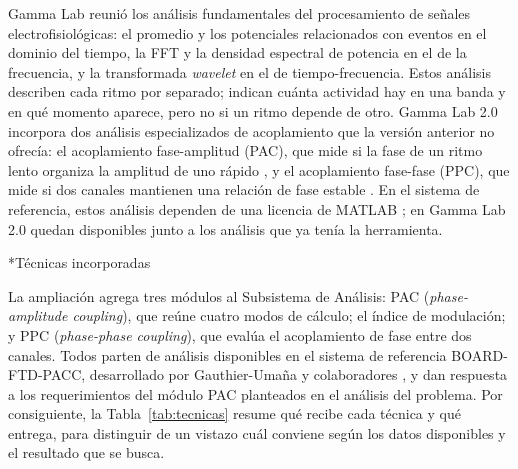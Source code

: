 \documentclass[12pt,letterpaper,oneside]{article}
\makeatletter
\newcommand{\subsubsubsection}[1]{%
  \@startsection{paragraph}{4}{\z@}{10pt plus 2pt minus 1pt}{4pt}%
    {\normalfont\normalsize\bfseries\itshape}*{#1}}
\makeatother
\begin{document}
Gamma Lab \cite{asencio2025} reunió los análisis fundamentales del procesamiento de señales electrofisiológicas: el promedio y los potenciales relacionados con eventos en el dominio del tiempo, la FFT y la densidad espectral de potencia en el de la frecuencia, y la transformada \textit{wavelet} en el de tiempo-frecuencia. Estos análisis describen cada ritmo por separado; indican cuánta actividad hay en una banda y en qué momento aparece, pero no si un ritmo depende de otro. Gamma Lab 2.0 incorpora dos análisis especializados de acoplamiento que la versión anterior no ofrecía: el acoplamiento fase-amplitud (PAC), que mide si la fase de un ritmo lento organiza la amplitud de uno rápido \cite{canolty2006}, y el acoplamiento fase-fase (PPC), que mide si dos canales mantienen una relación de fase estable \cite{vinck2010}. En el sistema de referencia, estos análisis dependen de una licencia de MATLAB \cite{gauthier2023}; en Gamma Lab 2.0 quedan disponibles junto a los análisis que ya tenía la herramienta.

\subsubsubsection{Técnicas incorporadas}

La ampliación agrega tres módulos al Subsistema de Análisis: PAC (\textit{phase-amplitude coupling}), que reúne cuatro modos de cálculo; el índice de modulación; y PPC (\textit{phase-phase coupling}), que evalúa el acoplamiento de fase entre dos canales. Todos parten de análisis disponibles en el sistema de referencia BOARD-FTD-PACC, desarrollado por Gauthier-Umaña y colaboradores \cite{gauthier2023}, y dan respuesta a los requerimientos del módulo PAC planteados en el análisis del problema. Por consiguiente, la Tabla~\ref{tab:tecnicas} resume qué recibe cada técnica y qué entrega, para distinguir de un vistazo cuál conviene según los datos disponibles y el resultado que se busca.
\end{document}
